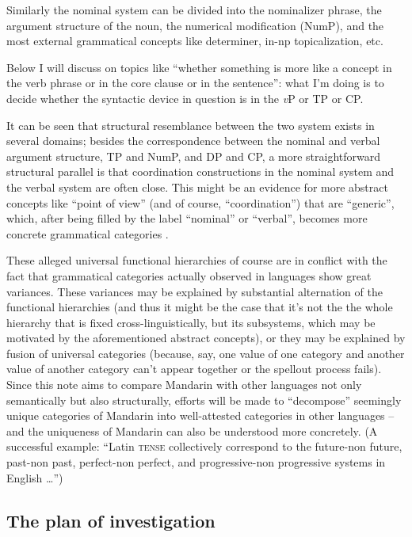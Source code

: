 \documentclass[UTF8, a4paper, oneside, scheme=plain, 12pt]{ctexrep}
\newcommand{\vP}{\textit{v}P}
\newcommand*{\category}[1]{\textsc{#1}}
\begin{document}
{Similarly the nominal system can be divided into 
the nominalizer phrase, 
the argument structure of the noun, 
the numerical modification (NumP), 
and the most external grammatical concepts like 
determiner, in-\acs{np} topicalization, etc. 

Below I will discuss on topics like 
``whether something is more like a concept in the verb phrase 
or in the core clause 
or in the sentence'':
what I'm doing is to decide whether 
the syntactic device in question is 
in the \vP{} or TP or CP.

It can be seen that structural resemblance between the two system 
exists in several domains; 
besides the correspondence between 
the nominal and verbal argument structure, 
TP and NumP, 
and DP and CP, 
a more straightforward structural parallel 
is that coordination constructions in the nominal system 
and the verbal system are often close. 
This might be an evidence for more abstract concepts 
like ``point of view'' (and of course, ``coordination'')
that are ``generic'', 
which, after being filled by the label ``nominal'' or ``verbal'', 
becomes more concrete grammatical categories
\citep{wiltschko2014universal}. 

These alleged universal functional hierarchies
of course are in conflict with the fact that 
grammatical categories actually observed in languages 
show great variances. 
These variances may be explained by substantial alternation 
of the functional hierarchies 
(and thus it might be the case that 
it's not the the whole hierarchy that is fixed cross-linguistically,
but its subsystems, which may be motivated by the aforementioned abstract concepts),
or they may be explained by fusion of universal categories 
(because, say, one value of one category and another value of another category 
can't appear together or the spellout process fails).
Since this note aims to compare Mandarin with other languages 
not only semantically but also structurally, 
efforts will be made to ``decompose'' seemingly unique 
categories of Mandarin into well-attested categories in other languages -- 
and the uniqueness of Mandarin can also be understood more concretely. 
(A successful example: ``Latin \category{tense} 
collectively correspond to the future-non future, 
past-non past, perfect-non perfect, and progressive-non progressive 
systems in English \dots'')



\subsection{The plan of investigation}

}
\end{document}
